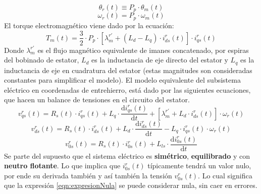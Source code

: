 \documentclass[10pt]{article}
\begin{document}
\begin{enumerate}
\begin{itemize}
\begin{equation}
		\end{equation}
		\begin{equation}
			\theta_{r} \left ( t \right ) \equiv P_{p} \cdot \theta_{m} \left ( t \right )
		\end{equation}
		\begin{equation}
			\omega_{r}\left ( t \right )=P_{p}\cdot \omega_{m}\left ( t \right )
		\end{equation}
		El torque electromagnético viene dado por la ecuación:
		\begin{equation}
			\label{sist:electromagnetico}
			T_{m}\left ( t \right )=\frac{3}{2} \cdot P_{p} \cdot \left [ \lambda_{m}^{r'}+\left ( L_{d}-L_{q} \right )\cdot i_{ds}^{r} \left ( t \right ) \right ] \cdot i_{qs}^{r}\left ( t \right )
		\end{equation}
		Donde $\lambda_{m}^{r'}$ es el flujo magnético equivalente de imanes concatenado, por espiras del bobinado de estator,
		$L_{d}$ es la inductancia de eje directo del estator y $L_{q}$ es la inductancia de eje en cuadratura del estator (estas magnitudes son consideradas constantes para simplificar el modelo).
		El modelo equivalente del subsistema eléctrico en coordenadas de entrehierro, está dado por las siguientes ecuaciones, que hacen un balance de tensiones en el circuito del estator.
		\begin{equation}
			\label{sist:electrico1}
			v_{qs}^{r}\left ( t \right )=R_{s}\left ( t \right )\cdot i_{qs}^{r}\left ( t \right )+L_{q}\cdot \frac{\mathrm{d} i_{qs}^{r}\left ( t \right )}{\mathrm{d} t}+\left [ \lambda_{m}^{r'}+L_{d}\cdot i_{ds}^{r}\left ( t \right ) \right ]\cdot \omega_{r}\left ( t \right )
		\end{equation}
		\begin{equation}
			\label{sist:electrico2}
			v_{ds}^{r}\left ( t \right )=R_{s}\left ( t \right )\cdot i_{ds}^{r}\left ( t \right )+L_{d}\cdot \frac{\mathrm{d} i_{ds}^{r}\left ( t \right )}{\mathrm{d} t}-L_{q}\cdot i_{qs}^{r}\left ( t \right )\cdot \omega_{r}\left ( t \right )
		\end{equation}
		\begin{equation}
			\label{eqn:expresionNula}
			v_{0s}^{r}\left ( t \right )=R_{s}\left ( t \right )\cdot i_{0s}^{r}\left ( t \right )+L_{ls}\cdot \frac{\mathrm{d} i_{0s}^{r}\left ( t \right )}{\mathrm{d} t}
		\end{equation}
		Se parte del supuesto que el sistema eléctrico es \textbf{simétrico}, \textbf{equilibrado} y con \textbf{neutro flotante}.
		Lo que implica que $i_{0s}^{r}(t)$ típicamente tendrá un valor nulo, por ende su derivada también y así también la tensión $v_{0s}^{r}(t)$.
		Lo cual significa que la expresión \ref{eqn:expresionNula} se puede considerar nula, sin caer en errores.
		

\end{itemize}
\end{enumerate}
\end{document}
